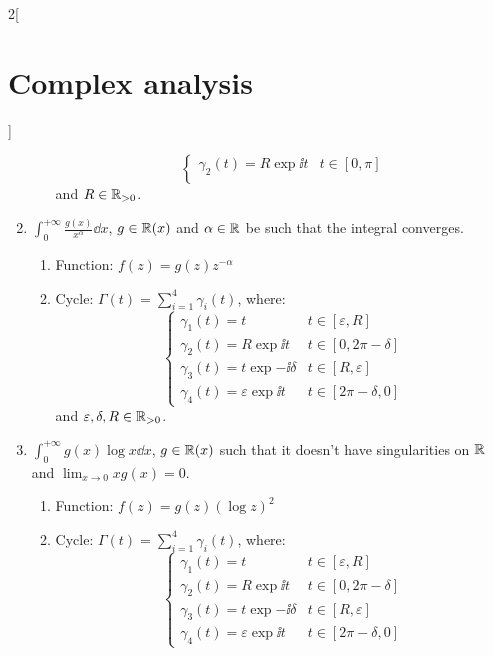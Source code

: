\documentclass[../../../main_math.tex]{subfiles}
\begin{document}
\begin{multicols}{2}[\section{Complex analysis}]
\begin{proposition}
\begin{enumerate}
\begin{enumerate}
$$\begin{cases}
                        \gamma_2(t)=R\exp{\ii t} & t\in[0,\pi] \\
                      \end{cases}
                    $$
                    and $R\in\mathbb{R}_{>0}$.
            \end{enumerate}
      \item $\displaystyle\int_0^{+\infty} \frac{g(x)}{x^\alpha}\dd{x}$, $g\in\mathbb{R}(x)$ and $\alpha\in\mathbb{R}$ be such that the integral converges.
            \begin{enumerate}
              \item Function: $f(z)=g(z)z^{-\alpha}$
              \item Cycle: $\Gamma(t)=\sum_{i=1}^4\gamma_i(t)$, where:
                    $$
                      \begin{cases}
                        \gamma_1(t)=t                      & t\in[\varepsilon,R] \\
                        \gamma_2(t)=R\exp{\ii t}           & t\in[0,2\pi-\delta] \\
                        \gamma_3(t)=t\exp{-\ii \delta}     & t\in[R,\varepsilon] \\
                        \gamma_4(t)=\varepsilon\exp{\ii t} & t\in[2\pi-\delta,0]
                      \end{cases}
                    $$
                    and $\varepsilon,\delta,R\in\mathbb{R}_{>0}$.
            \end{enumerate}
      \item $\displaystyle\int_0^{+\infty} g(x)\log{x}\dd{x}$, $g\in\mathbb{R}(x)$ such that it doesn't have singularities on $\mathbb{R}$ and $\displaystyle\lim_{x\to 0}xg(x)=0$.
            \begin{enumerate}
              \item Function: $f(z)=g(z){(\log{z})}^2$
              \item Cycle: $\Gamma(t)=\sum_{i=1}^4\gamma_i(t)$, where:
                    $$
                      \begin{cases}
                        \gamma_1(t)=t                      & t\in[\varepsilon,R] \\
                        \gamma_2(t)=R\exp{\ii t}           & t\in[0,2\pi-\delta] \\
                        \gamma_3(t)=t\exp{-\ii \delta}     & t\in[R,\varepsilon] \\
                        \gamma_4(t)=\varepsilon\exp{\ii t} & t\in[2\pi-\delta,0]
                      \end{cases}
$$
\end{enumerate}
\end{enumerate}
\end{proposition}
\end{multicols}
\end{document}
